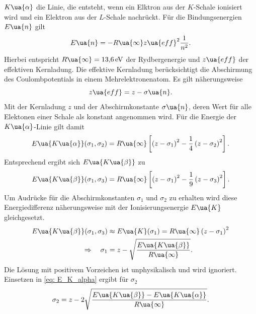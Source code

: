 $K\ua{\alpha}$ die Linie, die entsteht, wenn ein Elktron aus der $K$-Schale ionisiert wird und ein Elektron aus der $L$-Schale
nachrückt. Für die Bindungsenergien $E\ua{n}$ gilt
\begin{equation}
  E\ua{n} = -R\ua{\infty} z\ua{eff}^2 \frac{1}{n^2}.
  \label{eq: E_niveaus}
\end{equation}
Hierbei entspricht $R\ua{\infty} = \SI{13.6}{\eV}$ der Rydbergenergie und $z\ua{eff}$ der effektiven Kernladung. Die effektive
Kernladung berücksichtigt die Abschirmung des Coulombpotentials in einem Mehrelektronenatom. Es gilt näherungsweise
\begin{equation}
  z\ua{eff} = z - \sigma\ua{n}.
  \label{eq: abschirmkonstante}
\end{equation}
Mit der Kernladung $z$ und der Abschirmkonstante $\sigma\ua{n}$, deren Wert für alle Elektonen einer Schale als konstant angenommen wird.
Für die Energie der $K\ua{\alpha}$-Linie gilt damit
\begin{equation}
  E\ua{K\ua{\alpha}}(\sigma_1, \sigma_2) = R\ua{\infty} \left[\left(z - \sigma_1\right)^2 -  \frac{1}{4}\left(z - \sigma_2\right)^2\right].
  \label{eq: E_K_alpha}
\end{equation}
Entsprechend ergibt sich $E\ua{K\ua{\beta}}$ zu
\begin{equation}
  E\ua{K\ua{\beta}}(\sigma_1, \sigma_3) = R\ua{\infty} \left[\left(z - \sigma_1\right)^2 -  \frac{1}{9}\left(z - \sigma_3\right)^2\right].
  \label{eq: E_K_beta}
\end{equation}
Um Audrücke für die Abschirmkonstanten $\sigma_1$ und $\sigma_2$ zu erhalten wird diese Energiedifferenz
näherungsweise mit der Ionisierungsenergie $E\ua{K}$ gleichgesetzt.
\begin{align}
  \begin{aligned}
  E\ua{K\ua{\beta}}(\sigma_1, \sigma_3) &\approx E\ua{K}(\sigma_1) = R\ua{\infty} \left(z - \sigma_1\right)^2 \\
  \Rightarrow \quad \sigma_1 &= z - \sqrt{\frac{E\ua{K\ua{\beta}}}{R\ua{\infty}}}.
  \label{eq: sigma_1}
\end{aligned}
\end{align}
Die Lösung mit positivem Vorzeichen ist unphysikalisch und wird ignoriert. Einsetzen in \eqref{eq: E_K_alpha} ergibt für $\sigma_2$
\begin{equation}
  \sigma_2 = z - 2\sqrt{\frac{ E\ua{K\ua{\beta}} - E\ua{K\ua{\alpha}} }{ R\ua{\infty} } }.
  \label{eq: sigma_2}
\end{equation}

